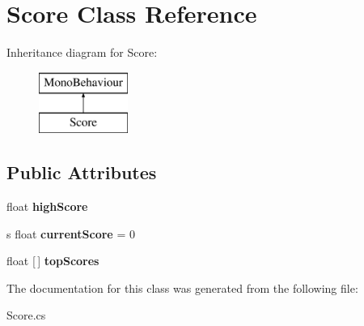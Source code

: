 \hypertarget{class_score}{}\section{Score Class Reference}
\label{class_score}
Inheritance diagram for Score\+:\begin{figure}[H]
\begin{center}
\leavevmode
\includegraphics[height=2.000000cm]{class_score}
\end{center}
\end{figure}
\subsection*{Public Attributes}
\begin{DoxyCompactItemize}
\item 
\mbox{\label{class_score_a1ddfcf4445cf346df89df41bedd3c714}} 
float {\bfseries high\+Score}
\item 
\mbox{\label{class_score_ac4f31ba927c4f661d4fd351cd2ed29f0}} 
s float {\bfseries current\+Score} = 0
\item 
\mbox{\label{class_score_a2bd3a3082f332e868fa03bc257a034f4}} 
float \mbox{[}$\,$\mbox{]} {\bfseries top\+Scores}
\end{DoxyCompactItemize}


The documentation for this class was generated from the following file\+:\begin{DoxyCompactItemize}
\item 
Score.\+cs\end{DoxyCompactItemize}
